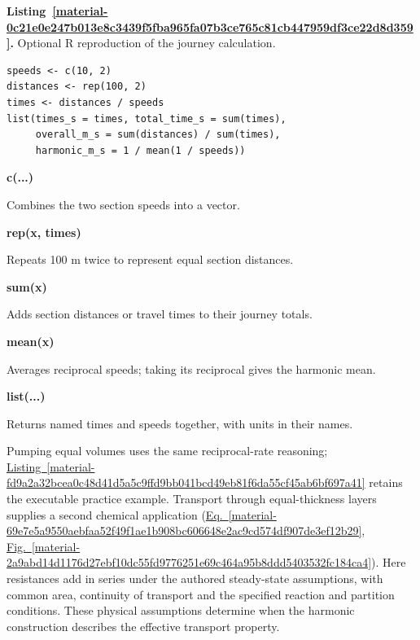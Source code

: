 \documentclass[11pt,a4paper]{article}
\newcounter{listing}
\begin{document}
\par\medskip
{}
\label{material-0c21e0e247b013e8c3439f5fba965fa07b3ce765c81cb447959df3ce22d8d359}
\noindent\textbf{Listing~\ref*{material-0c21e0e247b013e8c3439f5fba965fa07b3ce765c81cb447959df3ce22d8d359}.} Optional R reproduction of the journey calculation.\par\nopagebreak
\begin{Verbatim}[fontsize=\footnotesize,breaklines=true,breakanywhere=true]
speeds <- c(10, 2)
distances <- rep(100, 2)
times <- distances / speeds
list(times_s = times, total_time_s = sum(times),
     overall_m_s = sum(distances) / sum(times),
     harmonic_m_s = 1 / mean(1 / speeds))
\end{Verbatim}

\par\noindent\textbf{c(...)}

Combines the two section speeds into a vector.

\par\noindent\textbf{rep(x, times)}

Repeats 100 m twice to represent equal section distances.

\par\noindent\textbf{sum(x)}

Adds section distances or travel times to their journey totals.

\par\noindent\textbf{mean(x)}

Averages reciprocal speeds; taking its reciprocal gives the harmonic mean.

\par\noindent\textbf{list(...)}

Returns named times and speeds together, with units in their names.

\medskip

Pumping equal volumes uses the same reciprocal-rate reasoning; \hyperref[material-fd9a2a32bcea0c48d41d5a5c9ffd9bb041bcd49eb81f6da55cf45ab6bf697a41]{Listing~\ref*{material-fd9a2a32bcea0c48d41d5a5c9ffd9bb041bcd49eb81f6da55cf45ab6bf697a41}} retains the executable practice example. Transport through equal-thickness layers supplies a second chemical application (\hyperref[material-69e7e5a9550aebfaa52f49f1ae1b908bc606648e2ac9cd574df907de3ef12b29]{Eq.~\ref*{material-69e7e5a9550aebfaa52f49f1ae1b908bc606648e2ac9cd574df907de3ef12b29}}, \hyperref[material-2a9abd14d1176d27ebf10dc55fd9776251e69c464a95b8ddd5403532fc184ca4]{Fig.~\ref*{material-2a9abd14d1176d27ebf10dc55fd9776251e69c464a95b8ddd5403532fc184ca4}}). Here resistances add in series under the authored steady-state assumptions, with common area, continuity of transport and the specified reaction and partition conditions. These physical assumptions determine when the harmonic construction describes the effective transport property.
\end{document}
